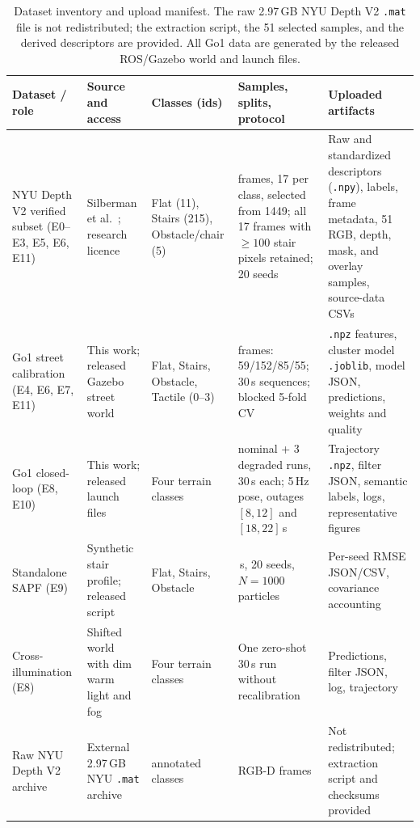 \documentclass[11pt, a4paper]{article}
\begin{document}
\begin{table}[htbp]
    \centering
    \caption{Dataset inventory and upload manifest. The raw 2.97\,GB NYU Depth V2 \texttt{.mat} file is not redistributed; the extraction script, the 51 selected samples, and the derived descriptors are provided. All Go1 data are generated by the released ROS/Gazebo world and launch files.}
    \label{tab:dataset_card}
    \scriptsize
    \setlength{\tabcolsep}{2.2pt}
    \renewcommand{\arraystretch}{1.02}
    \begin{tabularx}{\textwidth}{@{}>{\raggedright\arraybackslash}p{2.55cm} >{\raggedright\arraybackslash}p{2.30cm} >{\raggedright\arraybackslash}p{2.55cm} >{\raggedright\arraybackslash}X >{\raggedright\arraybackslash}p{2.65cm}@{}}
        \toprule
        \textbf{Dataset / role} & \textbf{Source and access} & \textbf{Classes (ids)} & \textbf{Samples, splits, protocol} & \textbf{Uploaded artifacts} \\
        \midrule
        NYU Depth V2 verified subset (E0--E3, E5, E6, E11) & Silberman et al.\ \cite{silberman2012indoor}; research licence & Flat (11), Stairs (215), Obstacle/chair (5) & 51 frames, 17 per class, selected from 1449; all 17 frames with $\ge100$ stair pixels retained; 20 seeds & Raw and standardized descriptors (\texttt{.npy}), labels, frame metadata, 51 RGB, depth, mask, and overlay samples, source-data CSVs \\
        Go1 street calibration (E4, E6, E7, E11) & This work; released Gazebo street world & Flat, Stairs, Obstacle, Tactile (0--3) & 351 frames: 59/152/85/55; 30\,s sequences; blocked 5-fold CV & \texttt{.npz} features, cluster model \texttt{.joblib}, model JSON, predictions, weights and quality \\
        Go1 closed-loop (E8, E10) & This work; released launch files & Four terrain classes & 3 nominal + 3 degraded runs, 30\,s each; 5\,Hz pose, outages $[8,12]$ and $[18,22]$\,s & Trajectory \texttt{.npz}, filter JSON, semantic labels, logs, representative figures \\
        Standalone SAPF (E9) & Synthetic stair profile; released script & Flat, Stairs, Obstacle & 30\,s, 20 seeds, $N=1000$ particles & Per-seed RMSE JSON/CSV, covariance accounting \\
        Cross-illumination (E8) & Shifted world with dim warm light and fog & Four terrain classes & One zero-shot 30\,s run without recalibration & Predictions, filter JSON, log, trajectory \\
        Raw NYU Depth V2 archive & External 2.97\,GB NYU \texttt{.mat} archive & 894 annotated classes & 1449 RGB-D frames & Not redistributed; extraction script and checksums provided \\
        \bottomrule
    \end{tabularx}
\end{table}
\end{document}
